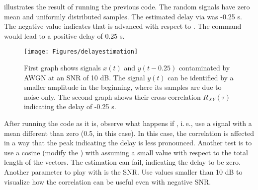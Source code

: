  illustrates the result of running the previous code. The random signals have zero mean and uniformly distributed samples. The estimated delay via  was -0.25 s. The negative value  indicates that  is advanced with respect to . The command  would lead to a positive delay of 0.25 s.

\begin{figure}
	\centering
		\texttt{[image: Figures/delayestimation]}		
	\caption[{First graph shows signals $x(t)$ and $y(t-0.25)$ contaminated by AWGN at a SNR of 10 dB.}]{First graph shows signals $x(t)$ and $y(t-0.25)$ contaminated by AWGN at an SNR of 10 dB. The signal $y(t)$ can be identified by a smaller amplitude in the beginning, where its samples are due to noise only. The second graph shows their cross-correlation $R_{XY}(\tau)$ indicating the delay of -0.25 s. \label{fig:delayestimation}}
\end{figure}

After running the code as it is, observe what happens if , i.\,e., use a signal with a mean different than zero (0.5, in this case). In this case, the correlation is affected in a way that the peak indicating the delay is less pronounced. Another test is to use a cosine (modify the ) with  assuming a small value with respect to the total length  of the vectors. The estimation can fail, indicating the delay to be zero. Another parameter to play with is the SNR. Use values smaller than 10 dB to visualize how the correlation can be useful even with negative SNR.

